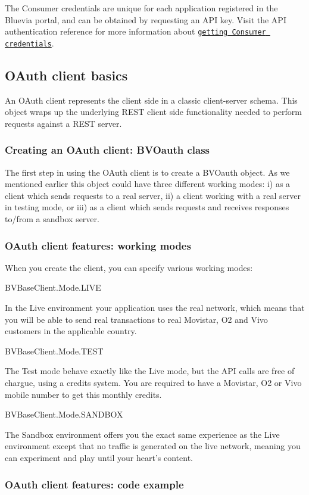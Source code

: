 The Consumer credentials are unique for each application registered in the Bluevia portal, and can be obtained by requesting an API key. Visit the API authentication reference for more information about \href{https://bluevia.com/en/knowledge/getStarted.Authentication#GetConsumerCredentials}{\tt getting Consumer credentials}.\hypertarget{blv_oauth_guide_oauth_client_basics_sec}{}\subsection{OAuth client basics}\label{blv_oauth_guide_oauth_client_basics_sec}
An OAuth client represents the client side in a classic client-\/server schema. This object wraps up the underlying REST client side functionality needed to perform requests against a REST server.\hypertarget{blv_oauth_guide_creating_oauth_client_sec}{}\subsubsection{Creating an OAuth client: BVOauth class}\label{blv_oauth_guide_creating_oauth_client_sec}
The first step in using the OAuth client is to create a BVOauth object. As we mentioned earlier this object could have three different working modes: i) as a client which sends requests to a real server, ii) a client working with a real server in testing mode, or iii) as a client which sends requests and receives responses to/from a sandbox server.\hypertarget{blv_oauth_guide_oauthclient_features_working_modes_sec}{}\subsubsection{OAuth client features: working modes}\label{blv_oauth_guide_oauthclient_features_working_modes_sec}
When you create the client, you can specify various working modes: 
\begin{DoxyItemize}
\item BVBaseClient.Mode.LIVE \par
In the Live environment your application uses the real network, which means that you will be able to send real transactions to real Movistar, O2 and Vivo customers in the applicable country.


\item BVBaseClient.Mode.TEST \par
The Test mode behave exactly like the Live mode, but the API calls are free of chargue, using a credits system. You are required to have a Movistar, O2 or Vivo mobile number to get this monthly credits.


\item BVBaseClient.Mode.SANDBOX \par
The Sandbox environment offers you the exact same experience as the Live environment except that no traffic is generated on the live network, meaning you can experiment and play until your heart’s content. 
\end{DoxyItemize}\hypertarget{blv_oauth_guide_oauthclient_features_code_examples_sec}{}\subsubsection{OAuth client features: code example}\label{blv_oauth_guide_oauthclient_features_code_examples_sec}
